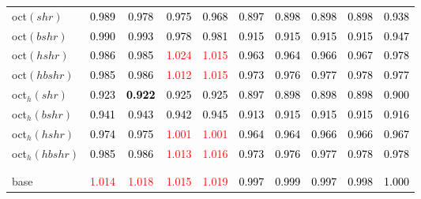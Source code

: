 \begin{tabular}[t]{l|ccccccccc}
oct$(shr)$ & \textcolor{black}{0.989} & \textcolor{black}{0.978} & \textcolor{black}{0.975} & \textcolor{black}{0.968} & \textcolor{black}{0.897} & \textcolor{black}{0.898} & \textcolor{black}{0.898} & \textcolor{black}{0.898} & \textcolor{black}{0.938}\\
oct$(bshr)$ & \textcolor{black}{0.990} & \textcolor{black}{0.993} & \textcolor{black}{0.978} & \textcolor{black}{0.981} & \textcolor{black}{0.915} & \textcolor{black}{0.915} & \textcolor{black}{0.915} & \textcolor{black}{0.915} & \textcolor{black}{0.947}\\
oct$(hshr)$ & \textcolor{black}{0.986} & \textcolor{black}{0.985} & \textcolor{red}{1.024} & \textcolor{red}{1.015} & \textcolor{black}{0.963} & \textcolor{black}{0.964} & \textcolor{black}{0.966} & \textcolor{black}{0.967} & \textcolor{black}{0.978}\\
oct$(hbshr)$ & \textcolor{black}{0.985} & \textcolor{black}{0.986} & \textcolor{red}{1.012} & \textcolor{red}{1.015} & \textcolor{black}{0.973} & \textcolor{black}{0.976} & \textcolor{black}{0.977} & \textcolor{black}{0.978} & \textcolor{black}{0.977}\\
oct$_h(shr)$ & \textcolor{black}{0.923} & \textcolor{black}{\textbf{0.922}} & \textcolor{black}{0.925} & \textcolor{black}{0.925} & \textcolor{black}{0.897} & \textcolor{black}{0.898} & \textcolor{black}{0.898} & \textcolor{black}{0.898} & \textcolor{black}{0.900}\\
oct$_h(bshr)$ & \textcolor{black}{0.941} & \textcolor{black}{0.943} & \textcolor{black}{0.942} & \textcolor{black}{0.945} & \textcolor{black}{0.913} & \textcolor{black}{0.915} & \textcolor{black}{0.915} & \textcolor{black}{0.915} & \textcolor{black}{0.916}\\
oct$_h(hshr)$ & \textcolor{black}{0.974} & \textcolor{black}{0.975} & \textcolor{red}{1.001} & \textcolor{red}{1.001} & \textcolor{black}{0.964} & \textcolor{black}{0.964} & \textcolor{black}{0.966} & \textcolor{black}{0.966} & \textcolor{black}{0.967}\\
oct$_h(hbshr)$ & \textcolor{black}{0.985} & \textcolor{black}{0.986} & \textcolor{red}{1.013} & \textcolor{red}{1.016} & \textcolor{black}{0.973} & \textcolor{black}{0.976} & \textcolor{black}{0.977} & \textcolor{black}{0.978} & \textcolor{black}{0.978}\\[-1.5ex]
\hline\\[-1.5ex]
\addlinespace[0.3em]
\multicolumn{10}{c}{\textbf{$k = 1$}}\\
base & \textcolor{red}{1.014} & \textcolor{red}{1.018} & \textcolor{red}{1.015} & \textcolor{red}{1.019} & \textcolor{black}{0.997} & \textcolor{black}{0.999} & \textcolor{black}{0.997} & \textcolor{black}{0.998} & \textcolor{black}{1.000}\\

\end{tabular}
